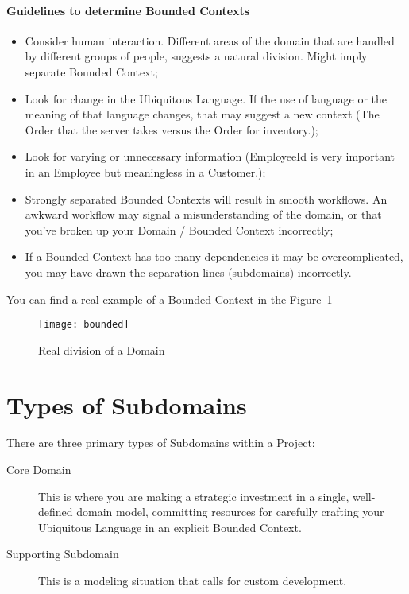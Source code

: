 \paragraph{Guidelines to determine Bounded Contexts}

\begin{itemize}
    \item Consider human interaction. Different areas of the domain that are handled by different groups of people, suggests a natural division. Might imply separate Bounded Context;
    \item Look for change in the Ubiquitous Language. If the use of language or the meaning of that language changes, that may suggest a new context (The Order that the server takes versus the Order for inventory.);
    \item Look for varying or unnecessary information (EmployeeId is very important in an Employee but meaningless in a Customer.);
    \item Strongly separated Bounded Contexts will result in smooth workflows. An awkward workflow may signal a misunderstanding of the domain, or that you've broken up your Domain / Bounded Context incorrectly;
    \item If a Bounded Context has too many dependencies it may be overcomplicated, you may have drawn the separation lines (subdomains) incorrectly.
\end{itemize}

You can find a real example of a Bounded Context in the Figure~\ref{fig:bounded}

\begin{figure}[ht]
\caption{Real division of a Domain}
\centering
\texttt{[image: bounded]}
 \label{fig:bounded}
\end{figure}

\section{Types of Subdomains}

There are three primary types of Subdomains within a Project:
\begin{description}
    \item[Core Domain] This is where you are making a strategic investment in a single, well-defined domain model, committing resources for carefully crafting your Ubiquitous Language in an explicit Bounded Context.
    \item[Supporting Subdomain] This is a modeling situation that calls for custom development. 
\end{description}

